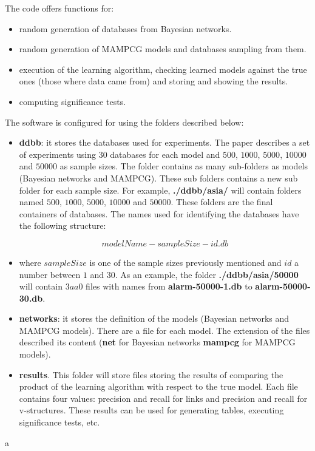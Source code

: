 \documentclass[11pt,professionalfont]{article}
\begin{document}
The code offers functions for:

\begin{itemize}
\item random generation of databases from Bayesian networks.
\item random generation of MAMPCG models and databases sampling from them.
\item execution of the learning algorithm, checking learned models against 
the true ones (those where data came from) and storing and showing the results.
\item computing significance tests.
\end{itemize}

The software is configured for using the folders described below:

\begin{itemize}
\item \textbf{ddbb}: it stores the databases used for experiments. The paper describes 
a set of experiments using $30$ databases for each model and  $500$, $1000$, $5000$, 
$10000$  and $50000$ as sample sizes. The folder contains as many sub-folders as models 
(Bayesian networks and MAMPCG). These sub folders contains a new sub folder for each sample 
size. For example, \textbf{./ddbb/asia/} will contain folders named $500$, $1000$, $5000$, 
$10000$ and $50000$. These folders are the final containers of databases. The names 
used for identifying the databases have the following  structure:

\begin{equation*}
modelName - sampleSize - id.db
\end{equation*}

\item [] where $sampleSize$ is one of the sample sizes previously mentioned and  
$id$ a number between $1$ and $30$. As an example, the folder \textbf{./ddbb/asia/50000} 
will contain $3aa0$ files with names from \textbf{alarm-50000-1.db} to \textbf{alarm-50000-30.db}.

\item \textbf{networks}: it stores the definition of the models (Bayesian networks and
MAMPCG models). There are a file for each model. The extension of the files described its
content (\textbf{net} for Bayesian networks \textbf{mampcg} for MAMPCG models).

\item \textbf{results}. This folder will store files storing the results of comparing the
product of the learning algorithm with respect to the true model. Each file contains four
values: precision and recall for links and precision and recall for v-structures. These
results can be used for generating tables, executing significance tests, etc.
\end{itemize}
a
\end{document}
